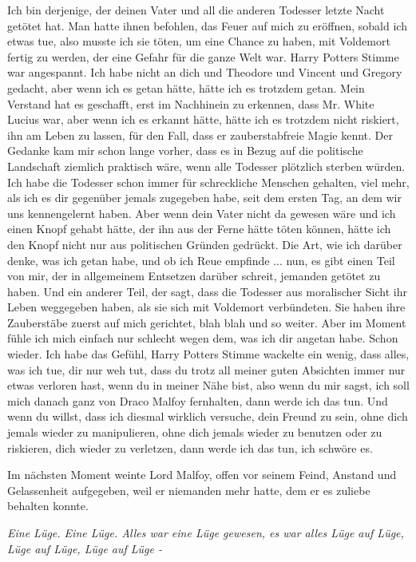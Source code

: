 \glqq{}Ich bin derjenige, der deinen Vater und all die anderen Todesser letzte
Nacht getötet hat. Man hatte ihnen befohlen, das Feuer auf mich zu eröffnen,
sobald ich etwas tue, also musste ich sie töten, um eine Chance zu haben, mit
Voldemort fertig zu werden, der eine Gefahr für die ganze Welt war.\grqq{} Harry
Potters Stimme war angespannt. \glqq{}Ich habe nicht an dich und Theodore und
Vincent und Gregory gedacht, aber wenn ich es getan hätte, hätte ich es trotzdem
getan. Mein Verstand hat es geschafft, erst im Nachhinein zu erkennen, dass Mr.
White Lucius war, aber wenn ich es erkannt hätte, hätte ich es trotzdem nicht
riskiert, ihn am Leben zu lassen, für den Fall, dass er zauberstabfreie Magie
kennt. Der Gedanke kam mir schon lange vorher, dass es in Bezug auf die
politische Landschaft ziemlich praktisch wäre, wenn alle Todesser plötzlich
sterben würden. Ich habe die Todesser schon immer für schreckliche Menschen
gehalten, viel mehr, als ich es dir gegenüber jemals zugegeben habe, seit dem
ersten Tag, an dem wir uns kennengelernt haben. Aber wenn dein Vater nicht da
gewesen wäre und ich einen Knopf gehabt hätte, der ihn aus der Ferne hätte töten
können, hätte ich den Knopf nicht nur aus politischen Gründen gedrückt. Die Art,
wie ich darüber denke, was ich getan habe, und ob ich Reue empfinde ... nun, es
gibt einen Teil von mir, der in allgemeinem Entsetzen darüber schreit, jemanden
getötet zu haben. Und ein anderer Teil, der sagt, dass die Todesser aus
moralischer Sicht ihr Leben weggegeben haben, als sie sich mit Voldemort
verbündeten. Sie haben ihre Zauberstäbe zuerst auf mich gerichtet, blah blah und
so weiter. Aber im Moment fühle ich mich einfach nur schlecht wegen dem, was ich
dir angetan habe. Schon wieder. Ich habe das Gefühl\grqq{}, Harry Potters Stimme
wackelte ein wenig, \glqq{}dass alles, was ich tue, dir nur weh tut, dass du
trotz all meiner guten Absichten immer nur etwas verloren hast, wenn du in
meiner Nähe bist, also wenn du mir sagst, ich soll mich danach ganz von Draco
Malfoy fernhalten, dann werde ich das tun. Und wenn du willst, dass ich diesmal
wirklich versuche, dein Freund zu sein, ohne dich jemals wieder zu manipulieren,
ohne dich jemals wieder zu benutzen oder zu riskieren, dich wieder zu verletzen,
dann werde ich das tun, ich schwöre es.\grqq{}

Im nächsten Moment weinte Lord Malfoy, offen vor seinem Feind, Anstand und
Gelassenheit aufgegeben, weil er niemanden mehr hatte, dem er es zuliebe
behalten konnte.

\emph{Eine Lüge. Eine Lüge. Alles war eine Lüge gewesen, es war alles Lüge auf
Lüge, Lüge auf Lüge, Lüge auf Lüge -}


